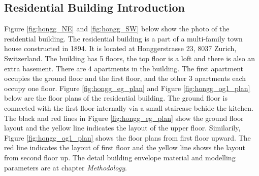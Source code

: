 \documentclass[11pt, a4paper]{article}
\theoremstyle{definition}
\begin{document}
	\subsection{Residential Building Introduction}
		Figure \ref{fig:hongg_NE} and \ref{fig:hongg_SW} below show the photo of the residential building. The residential building is a part of a multi-family town house constructed in 1894. It is located at Honggerstrasse 23, 8037 Zurich, Switzerland. The building has 5 floors, the top floor is a loft and there is also an extra basement. There are 4 apartments in the building. The first apartment occupies the ground floor and the first floor, and the other 3 apartments each occupy one floor. Figure \ref{fig:hongg_eg_plan} and Figure \ref{fig:hongg_og1_plan} below are the floor plans of the residential building. The ground floor is connected with the first floor internally via a small staircase behide the kitchen. The black and red lines in Figure \ref{fig:hongg_eg_plan} show the ground floor layout and the yellow line indicates the layout of the upper floor. Similarily, Figure \ref{fig:hongg_og1_plan} shows the floor plans from first floor upward. The  red line indicates the layout of first floor and the yellow line shows the layout from second floor up. The detail building envelope material and modelling parameters are at chapter \textit{Methodology}.\\
		
\end{document}
